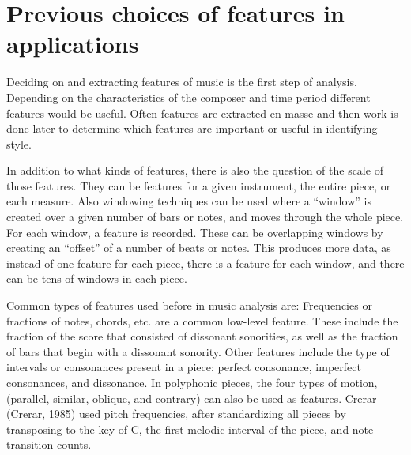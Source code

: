 \documentclass[12pt,twoside]{reedthesis}
\theoremstyle{definition}
\theoremstyle{definition}
\theoremstyle{definition}
\theoremstyle{remark}
\begin{document}
\section{Previous choices of features in
applications}\label{previous-choices-of-features-in-applications}

Deciding on and extracting features of music is the first step of
analysis. Depending on the characteristics of the composer and time
period different features would be useful. Often features are extracted
en masse and then work is done later to determine which features are
important or useful in identifying style.

In addition to what kinds of features, there is also the question of the
scale of those features. They can be features for a given instrument,
the entire piece, or each measure. Also windowing techniques can be used
where a ``window'' is created over a given number of bars or notes, and
moves through the whole piece. For each window, a feature is recorded.
These can be overlapping windows by creating an ``offset'' of a number
of beats or notes. This produces more data, as instead of one feature
for each piece, there is a feature for each window, and there can be
tens of windows in each piece.

Common types of features used before in music analysis are: Frequencies
or fractions of notes, chords, etc. are a common low-level feature.
These include the fraction of the score that consisted of dissonant
sonorities, as well as the fraction of bars that begin with a dissonant
sonority. Other features include the type of intervals or consonances
present in a piece: perfect consonance, imperfect consonances, and
dissonance. In polyphonic pieces, the four types of motion, (parallel,
similar, oblique, and contrary) can also be used as features. Crerar
(Crerar, 1985) used pitch frequencies, after standardizing all pieces by
transposing to the key of C, the first melodic interval of the piece,
and note transition counts.
\end{document}
